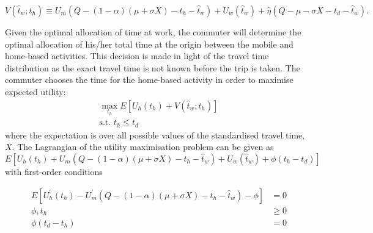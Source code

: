 \documentclass[12pt,a4paper,british]{article}
\theoremstyle{definition}
\theoremstyle{plain}
\theoremstyle{plain}
\begin{document}
\[
V\left(\hat{t}_{w};t_{h}\right)\equiv U_{m}\left(Q-\left(1-\alpha\right)\left(\mu+\sigma X\right)-t_{h}-\hat{t}_{w}\right)+U_{w}\left(\hat{t}_{w}\right)+\hat{\eta}\left(Q-\mu-\sigma X-t_{d}-\hat{t}_{w}\right).
\]

Given the optimal allocation of time at work, the commuter will determine
the optimal allocation of his/her total time at the origin between
the mobile and home-based activities. This decision is made in light
of the travel time distribution as the exact travel time is not known
before the trip is taken. The commuter chooses the time for the home-based
activity in order to maximise expected utility:
\begin{gather*}
\max_{t_{h}}E\left[U_{h}\left(t_{h}\right)+V\left(\hat{t}_{w};t_{h}\right)\right]\\
\mbox{s.t. }t_{h}\leq t_{d}
\end{gather*}
where the expectation is over all possible values of the standardised
travel time, $X$. The Lagrangian of the utility maximisation problem
can be given as 
\[
E\left[U_{h}\left(t_{h}\right)+U_{m}\left(Q-\left(1-\alpha\right)\left(\mu+\sigma X\right)-t_{h}-\hat{t}_{w}\right)+U_{w}\left(\hat{t}_{w}\right)+\phi\left(t_{h}-t_{d}\right)\right]
\]
with first-order conditions

\begin{subequations}\label{eq:th_stage}
\begin{align}
E\left[U_{h}^{\prime}\left(t_{h}\right)-U_{m}^{\prime}\left(Q-\left(1-\alpha\right)\left(\mu+\sigma X\right)-t_{h}-\hat{t}_{w}\right)-\phi\right] & =0\label{eq:stage1_wrt_th}\\
\phi,t_{h} & \geq0\label{eq:stage1_lambda}\\
\phi\left(t_{d}-t_{h}\right) & =0\label{eq:stage1_lambdai_const}
\end{align}

\end{subequations}
\end{document}
